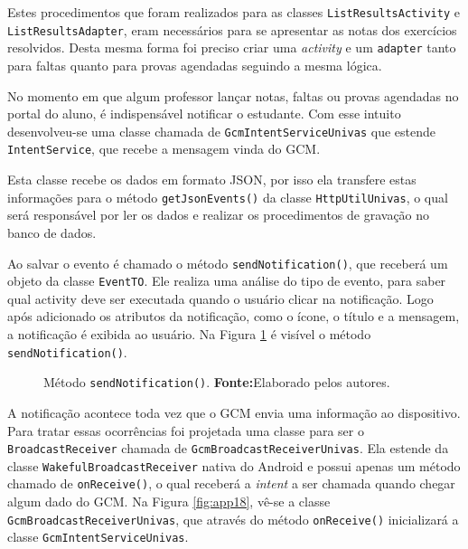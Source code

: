 	\par Estes procedimentos que foram realizados para as classes
\texttt{ListResultsActivity} e \texttt{ListResultsAdapter}, eram necessários
para se apresentar as notas dos exercícios resolvidos. Desta mesma forma foi
preciso criar uma \textit{activity} e um \texttt{adapter} tanto para faltas
quanto para provas agendadas seguindo a mesma lógica.

	\par No momento em que algum professor lançar notas, faltas ou provas agendadas
no portal do aluno, é indispensável notificar o estudante. Com esse intuito
desenvolveu-se uma classe chamada de \texttt{GcmIntentServiceUnivas} que
estende \texttt{IntentService}, que recebe a mensagem vinda do GCM.

	\par Esta classe recebe os dados em formato JSON, por isso ela transfere estas
informações para o método \texttt{getJsonEvents()} da classe
\texttt{HttpUtilUnivas}, o qual será responsável por ler os dados e realizar os
procedimentos de gravação no banco de dados.

	\par Ao salvar o evento é chamado o método \texttt{sendNotification()}, que
receberá um objeto da classe \texttt{EventTO}. Ele realiza uma análise do tipo
de evento, para saber qual activity deve ser executada quando o usuário clicar
na notificação. Logo após adicionado os atributos da notificação, como o ícone,
o título e a mensagem, a notificação é exibida ao usuário. Na Figura
\ref{fig:app17} é visível o método \texttt{sendNotification()}.

	\begin{figure}[h!] 
		\caption[Método sendNotification()]{ Método \texttt{sendNotification()}.
		\textbf{Fonte:}Elaborado pelos autores.}
		\label{fig:app17}
	\end{figure}
	

	\par A notificação acontece toda vez que o GCM envia uma informação ao
dispositivo. Para tratar essas ocorrências foi projetada uma classe para ser o
\texttt{BroadcastReceiver} chamada de \texttt{GcmBroadcastReceiverUnivas}. Ela
estende da classe \texttt{WakefulBroadcastReceiver} nativa do Android e possui
apenas um método chamado de \texttt{onReceive()}, o qual receberá a
\textit{intent} a ser chamada quando chegar algum dado do GCM. Na Figura
\ref{fig:app18}, vê-se a classe \texttt{GcmBroadcastReceiverUnivas}, que
através do método \texttt{onReceive()} inicializará a classe
\texttt{GcmIntentServiceUnivas}.

